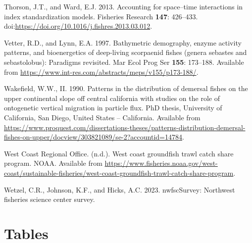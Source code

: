 \documentclass[11pt,
  english,
  letterpaper,
]{article}
\newlength{\cslhangindent}
\newenvironment{CSLReferences}[2] %
 {%
  \setlength{\parindent}{0pt}
  \ifodd #1 \everypar{\setlength{\hangindent}{\cslhangindent}}\ignorespaces\fi
  \ifnum #2 > 0
  \setlength{\parskip}{#2\baselineskip}
  \fi
 }%
 {}
\begin{document}
\begin{CSLReferences}{1}{0}
\leavevmode{}%
Thorson, J.T., and Ward, E.J. 2013. Accounting for space--time interactions in index standardization models. Fisheries Research \textbf{147}: 426--433. doi:\url{https://doi.org/10.1016/j.fishres.2013.03.012}.

\leavevmode{}%
Vetter, R.D., and Lynn, E.A. 1997. Bathymetric demography, enzyme activity patterns, and bioenergetics of deep-living scorpaenid fishes (genera sebastes and sebastolobus): Paradigms revisited. Mar Ecol Prog Ser \textbf{155}: 173--188. Available from \url{https://www.int-res.com/abstracts/meps/v155/p173-188/}.

\leavevmode{}%
Wakefield, W.W., II. 1990. Patterns in the distribution of demersal fishes on the upper continental slope off central california with studies on the role of ontogenetic vertical migration in particle flux. PhD thesis, University of California, San Diego, United States -- California. Available from \url{https://www.proquest.com/dissertations-theses/patterns-distribution-demersal-fishes-on-upper/docview/303821089/se-2?accountid=14784}.

\leavevmode{}%
West Coast Regional Office. (n.d.). West coast groundfish trawl catch share program. {NOAA}. Available from \url{https://www.fisheries.noaa.gov/west-coast/sustainable-fisheries/west-coast-groundfish-trawl-catch-share-program}.

\leavevmode{}%
Wetzel, C.R., Johnson, K.F., and Hicks, A.C. 2023. nwfscSurvey: Northwest fisheries science center survey.

\end{CSLReferences}

\clearpage

\hypertarget{tables}{%
\section{Tables}\label{tables}}

\begingroup\fontsize{10}{12}\selectfont
\begingroup\fontsize{10}{12}\selectfont
\end{document}
